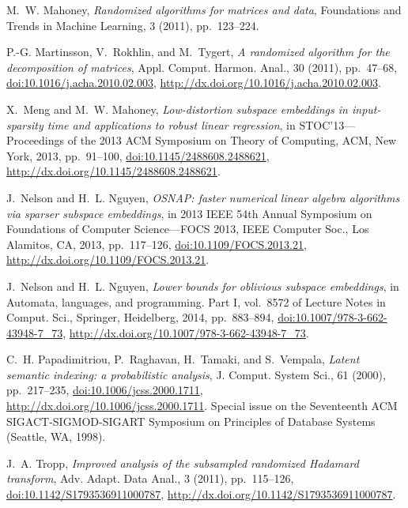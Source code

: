 \documentclass[final]{siamart1116}
\numberwithin{equation}{section}
\numberwithin{theorem}{section}
\numberwithin{figure}{section}
\begin{document}
\begin{thebibliography}{10}
{\sc M.~W. Mahoney}, {\em Randomized algorithms for matrices and data},
  Foundations and Trends{\textregistered} in Machine Learning, 3 (2011),
  pp.~123--224.

{\sc P.-G. Martinsson, V.~Rokhlin, and M.~Tygert}, {\em A randomized algorithm
  for the decomposition of matrices}, Appl. Comput. Harmon. Anal., 30 (2011),
  pp.~47--68, \href{http://dx.doi.org/10.1016/j.acha.2010.02.003}
  {doi:10.1016/j.acha.2010.02.003},
  \url{http://dx.doi.org/10.1016/j.acha.2010.02.003}.

{\sc X.~Meng and M.~W. Mahoney}, {\em Low-distortion subspace embeddings in
  input-sparsity time and applications to robust linear regression}, in
  S{TOC}'13---{P}roceedings of the 2013 {ACM} {S}ymposium on {T}heory of
  {C}omputing, ACM, New York, 2013, pp.~91--100,
  \href{http://dx.doi.org/10.1145/2488608.2488621}
  {doi:10.1145/2488608.2488621},
  \url{http://dx.doi.org/10.1145/2488608.2488621}.

{\sc J.~Nelson and H.~L. Nguyen}, {\em O{SNAP}: faster numerical linear algebra
  algorithms via sparser subspace embeddings}, in 2013 {IEEE} 54th {A}nnual
  {S}ymposium on {F}oundations of {C}omputer {S}cience---{FOCS} 2013, IEEE
  Computer Soc., Los Alamitos, CA, 2013, pp.~117--126,
  \href{http://dx.doi.org/10.1109/FOCS.2013.21} {doi:10.1109/FOCS.2013.21},
  \url{http://dx.doi.org/10.1109/FOCS.2013.21}.

{\sc J.~Nelson and H.~L. Nguyen}, {\em Lower bounds for oblivious subspace
  embeddings}, in Automata, languages, and programming. {P}art {I}, vol.~8572
  of Lecture Notes in Comput. Sci., Springer, Heidelberg, 2014, pp.~883--894,
  \href{http://dx.doi.org/10.1007/978-3-662-43948-7\_73}
  {doi:10.1007/978-3-662-43948-7\_73},
  \url{http://dx.doi.org/10.1007/978-3-662-43948-7_73}.

{\sc C.~H. Papadimitriou, P.~Raghavan, H.~Tamaki, and S.~Vempala}, {\em Latent
  semantic indexing: a probabilistic analysis}, J. Comput. System Sci., 61
  (2000), pp.~217--235, \href{http://dx.doi.org/10.1006/jcss.2000.1711}
  {doi:10.1006/jcss.2000.1711}, \url{http://dx.doi.org/10.1006/jcss.2000.1711}.
\newblock Special issue on the Seventeenth ACM SIGACT-SIGMOD-SIGART Symposium
  on Principles of Database Systems (Seattle, WA, 1998).

{\sc J.~A. Tropp}, {\em Improved analysis of the subsampled randomized
  {H}adamard transform}, Adv. Adapt. Data Anal., 3 (2011), pp.~115--126,
  \href{http://dx.doi.org/10.1142/S1793536911000787}
  {doi:10.1142/S1793536911000787},
  \url{http://dx.doi.org/10.1142/S1793536911000787}.


\end{thebibliography}
\end{document}
